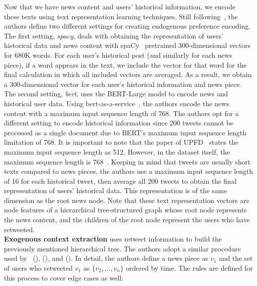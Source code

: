 Now that we have news content and users' historical information, we encode these texts using text representation learning techniques. Still following~\cite{UPFD_Dataset_Shu}, the authors define two different settings for creating endogenous preference encoding. The first setting, \emph{spacy}, deals with obtaining the representation of users' historical data and news content with spaCy~\parencite{SpaCy_Honnibal} pretrained 300-dimensional vectors for 680K words. For each user's historical post (and similarly for each news piece), if a word appears in the text, we include the vector for that word for the final calculation in which all included vectors are averaged. As a result, we obtain a 300-dimensional vector for each user's historical information and news piece. The second setting, \emph{bert}, uses the BERT-Large model to encode news and historical user data. Using bert-as-a-service~\parencite{BertAsAService_Xiao}, the authors encode the news content with a maximum input sequence length of 768. The authors opt for a different setting to encode historical information since 200 tweets cannot be processed as a single document due to BERT's maximum input sequence length limitation of 768. It is important to note that the paper of UPFD~\parencite{UPFD_Dataset_Shu} states the maximum input sequence length as 512. However, in the dataset itself, the maximum sequence length is 768~\parencite{UPFD_PyGTeam}. Keeping in mind that tweets are usually short texts compared to news pieces, the authors use a maximum input sequence length of 16 for each historical tweet, then average all 200 tweets to obtain the final representation of users' historical data. This representation is of the same dimension as the root news node. Note that these text representation vectors are node features of a hierarchical tree-structured graph whose root node represents the news content, and the children of the root node represent the users who have retweeted.\\
\textbf{Exogenous context extraction} uses retweet information to build the previously mentioned hierarchical tree. The authors adopt a similar procedure used by~\citeauthor{GraphNeuralNetworksWithContinualLearningFakeNewsDetection_Han} (\citeyear{GraphNeuralNetworksWithContinualLearningFakeNewsDetection_Han}),\citeauthor{GeometricDeepLearningOnGraphsAndManifolds_Monti} (\citeyear{GeometricDeepLearningOnGraphsAndManifolds_Monti}), and \citeauthor{HierarchicalPropagationNetworksForFND_Shu} (\citeyear{HierarchicalPropagationNetworksForFND_Shu}). In detail, the authors define a news piece as $v_1$ and the set of users who retweeted $v_1$ as $\{v_2, \dots , v_n\}$ ordered by time. The rules are defined for this process to cover edge cases as well:
